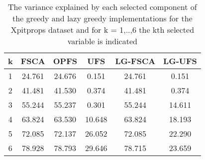 \begin{table}
	\begin{center}
		\begin{tabular}{c c c c c c}
			k & FSCA & OPFS & UFS & LG-FSCA & LG-UFS \\
			\hline
			1 & 24.761 & 24.676 & 0.151 & 24.761 & 0.151 \\
			2 & 41.481 & 41.530 & 0.374 & 41.481 & 0.374 \\
			3 & 55.244 & 55.237 & 0.301 & 55.244 & 14.611 \\
			4 & 63.824 & 63.530 & 10.648 & 63.824 & 18.193 \\
			5 & 72.085 & 72.137 & 26.052 & 72.085 & 22.290 \\
			6 & 78.928 & 78.793 & 29.646 & 78.715 & 23.659 \\
		\end{tabular}
	\end{center}
	\caption{The variance explained by each selected component of the greedy and lazy greedy implementations for the Xpitprops dataset and for k = 1,..,6 the kth selected variable is indicated}
\end{table}
